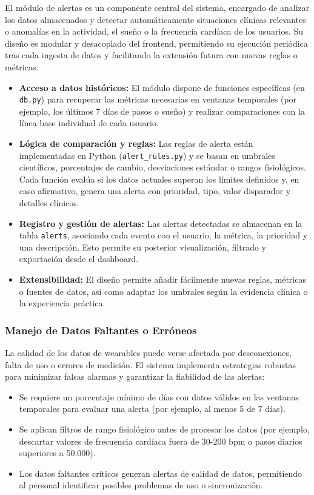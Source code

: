 El módulo de alertas es un componente central del sistema, encargado de analizar los datos almacenados y detectar automáticamente situaciones clínicas relevantes o anomalías en la actividad, el sueño o la frecuencia cardíaca de los usuarios. Su diseño es modular y desacoplado del frontend, permitiendo su ejecución periódica tras cada ingesta de datos y facilitando la extensión futura con nuevas reglas o métricas.

\begin{itemize}
    \item \textbf{Acceso a datos históricos:} El módulo dispone de funciones específicas (en \texttt{db.py}) para recuperar las métricas necesarias en ventanas temporales (por ejemplo, los últimos 7 días de pasos o sueño) y realizar comparaciones con la línea base individual de cada usuario.
    \item \textbf{Lógica de comparación y reglas:} Las reglas de alerta están implementadas en Python (\texttt{alert\_rules.py}) y se basan en umbrales científicos, porcentajes de cambio, desviaciones estándar o rangos fisiológicos. Cada función evalúa si los datos actuales superan los límites definidos y, en caso afirmativo, genera una alerta con prioridad, tipo, valor disparador y detalles clínicos.
    \item \textbf{Registro y gestión de alertas:} Las alertas detectadas se almacenan en la tabla \texttt{alerts}, asociando cada evento con el usuario, la métrica, la prioridad y una descripción. Esto permite su posterior visualización, filtrado y exportación desde el dashboard.
    \item \textbf{Extensibilidad:} El diseño permite añadir fácilmente nuevas reglas, métricas o fuentes de datos, así como adaptar los umbrales según la evidencia clínica o la experiencia práctica.
\end{itemize}

\subsubsection*{Manejo de Datos Faltantes o Erróneos}
La calidad de los datos de wearables puede verse afectada por desconexiones, falta de uso o errores de medición. El sistema implementa estrategias robustas para minimizar falsas alarmas y garantizar la fiabilidad de las alertas:
\begin{itemize}
    \item Se requiere un porcentaje mínimo de días con datos válidos en las ventanas temporales para evaluar una alerta (por ejemplo, al menos 5 de 7 días).
    \item Se aplican filtros de rango fisiológico antes de procesar los datos (por ejemplo, descartar valores de frecuencia cardíaca fuera de 30-200 bpm o pasos diarios superiores a 50.000).
    \item Los datos faltantes críticos generan alertas de calidad de datos, permitiendo al personal identificar posibles problemas de uso o sincronización.
\end{itemize}

